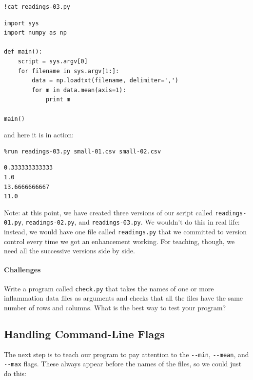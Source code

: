 \documentclass{book}
\begin{document}
\begin{verbatim}
!cat readings-03.py
\end{verbatim}

\begin{verbatim}
import sys
import numpy as np

def main():
    script = sys.argv[0]
    for filename in sys.argv[1:]:
        data = np.loadtxt(filename, delimiter=',')
        for m in data.mean(axis=1):
            print m

main()
\end{verbatim}

and here it is in action:

\begin{verbatim}
%run readings-03.py small-01.csv small-02.csv
\end{verbatim}

\begin{verbatim}
0.333333333333
1.0
13.6666666667
11.0
\end{verbatim}

Note: at this point, we have created three versions of our script called
\texttt{readings-01.py}, \texttt{readings-02.py}, and
\texttt{readings-03.py}. We wouldn't do this in real life: instead, we
would have one file called \texttt{readings.py} that we committed to
version control every time we got an enhancement working. For teaching,
though, we need all the successive versions side by side.

\mbox{}\paragraph{Challenges}

\begin{swcenumerate}
\item
  Write a program called \texttt{check.py} that takes the names of one
  or more inflammation data files as arguments and checks that all the
  files have the same number of rows and columns. What is the best way
  to test your program?
\end{swcenumerate}

\subsection{Handling Command-Line Flags}

The next step is to teach our program to pay attention to the
\texttt{-{}-min}, \texttt{-{}-mean}, and \texttt{-{}-max} flags. These
always appear before the names of the files, so we could just do this:
\end{document}
